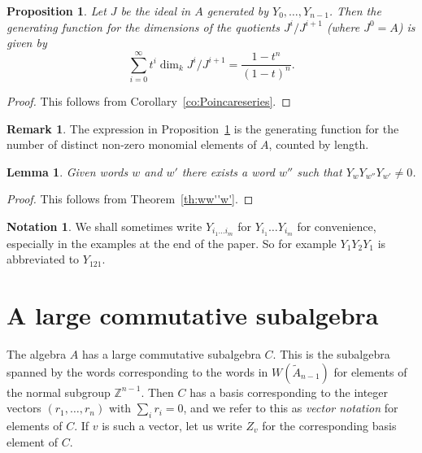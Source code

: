 \documentclass[12pt]{amsart}
\newcommand{\bZ}{{\mathbb{Z}}}
\numberwithin{equation}{section}
\newtheorem{lemma}[equation]{Lemma}
\newtheorem{proposition}[equation]{Proposition}
\theoremstyle{definition}
\newtheorem{notation}[equation]{Notation}
\newtheorem{remark}[equation]{Remark}
\begin{document}
\begin{proposition}\label{pr:genfn}
Let $J$ be the ideal in $A$ generated by
$Y_0,\dots,Y_{n-1}$. Then the generating function for the dimensions
of the quotients $J^i/J^{i+1}$ (where $J^0=A$) is given by
\begin{equation*}
\sum_{i=0}^\infty t^i\dim_k J^i/J^{i+1}=\frac{1-t^n}{(1-t)^n}.
\end{equation*}
\end{proposition}
\begin{proof}
This follows from Corollary~\ref{co:Poincareseries}.
\end{proof}

\begin{remark}
The expression in Proposition~\ref{pr:genfn} is
the generating function for the number of distinct non-zero
monomial elements of $A$, counted by length. 
\end{remark}

\begin{lemma}\label{le:prime}
Given words $w$ and $w'$ there exists a word $w''$ such that
$Y_wY_{w''}Y_{w'}\ne 0$.
\end{lemma}
\begin{proof}
This follows from Theorem~\ref{th:ww''w'}.
\end{proof}


\begin{notation}\label{not:Y}
We shall sometimes write $Y_{i_1\dots i_m}$ for $Y_{i_1}\dots Y_{i_m}$
for convenience, especially in the examples at the end of the
paper. So for example $Y_1Y_2Y_1$ is abbreviated to $Y_{121}$. 
\end{notation}


\section{A large commutative subalgebra}\label{se:C}

The algebra $A$ has a large commutative subalgebra $C$.
This is the subalgebra
spanned by the words corresponding to the words in $W(\tilde A_{n-1})$
for elements of the normal subgroup $\bZ^{n-1}$. 
Then $C$ has a basis corresponding to the integer vectors
$(r_1,\dots,r_n)$ with $\sum_i r_i=0$, and we refer to this as 
\emph{vector notation} for elements of $C$. If $v$ is such a vector, let us
write $Z_v$ for the corresponding basis element of $C$. 
\end{document}
